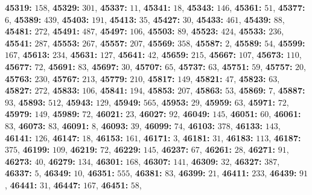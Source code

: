 \textsf{\bfseries 45319:} $158$, \textsf{\bfseries 45329:} $301$, \textsf{\bfseries 45337:} $11$, \textsf{\bfseries 45341:} $18$, \textsf{\bfseries 45343:} $146$, \textsf{\bfseries 45361:} $51$, \textsf{\bfseries 45377:} $6$, \textsf{\bfseries 45389:} $439$, \textsf{\bfseries 45403:} $191$, \textsf{\bfseries 45413:} $35$, \textsf{\bfseries 45427:} $30$, \textsf{\bfseries 45433:} $461$, \textsf{\bfseries 45439:} $88$, \textsf{\bfseries 45481:} $272$, \textsf{\bfseries 45491:} $487$, \textsf{\bfseries 45497:} $106$, \textsf{\bfseries 45503:} $89$, \textsf{\bfseries 45523:} $424$, \textsf{\bfseries 45533:} $236$, \textsf{\bfseries 45541:} $287$, \textsf{\bfseries 45553:} $267$, \textsf{\bfseries 45557:} $207$, \textsf{\bfseries 45569:} $358$, \textsf{\bfseries 45587:} $2$, \textsf{\bfseries 45589:} $54$, \textsf{\bfseries 45599:} $167$, \textsf{\bfseries 45613:} $234$, \textsf{\bfseries 45631:} $127$, \textsf{\bfseries 45641:} $42$, \textsf{\bfseries 45659:} $215$, \textsf{\bfseries 45667:} $107$, \textsf{\bfseries 45673:} $110$, \textsf{\bfseries 45677:} $72$, \textsf{\bfseries 45691:} $83$, \textsf{\bfseries 45697:} $30$, \textsf{\bfseries 45707:} $65$, \textsf{\bfseries 45737:} $63$, \textsf{\bfseries 45751:} $59$, \textsf{\bfseries 45757:} $20$, \textsf{\bfseries 45763:} $230$, \textsf{\bfseries 45767:} $213$, \textsf{\bfseries 45779:} $210$, \textsf{\bfseries 45817:} $149$, \textsf{\bfseries 45821:} $47$, \textsf{\bfseries 45823:} $63$, \textsf{\bfseries 45827:} $272$, \textsf{\bfseries 45833:} $106$, \textsf{\bfseries 45841:} $194$, \textsf{\bfseries 45853:} $207$, \textsf{\bfseries 45863:} $53$, \textsf{\bfseries 45869:} $7$, \textsf{\bfseries 45887:} $93$, \textsf{\bfseries 45893:} $512$, \textsf{\bfseries 45943:} $129$, \textsf{\bfseries 45949:} $565$, \textsf{\bfseries 45953:} $29$, \textsf{\bfseries 45959:} $63$, \textsf{\bfseries 45971:} $72$, \textsf{\bfseries 45979:} $149$, \textsf{\bfseries 45989:} $72$, \textsf{\bfseries 46021:} $23$, \textsf{\bfseries 46027:} $92$, \textsf{\bfseries 46049:} $145$, \textsf{\bfseries 46051:} $60$, \textsf{\bfseries 46061:} $83$, \textsf{\bfseries 46073:} $83$, \textsf{\bfseries 46091:} $8$, \textsf{\bfseries 46093:} $39$, \textsf{\bfseries 46099:} $74$, \textsf{\bfseries 46103:} $378$, \textsf{\bfseries 46133:} $143$, \textsf{\bfseries 46141:} $126$, \textsf{\bfseries 46147:} $18$, \textsf{\bfseries 46153:} $161$, \textsf{\bfseries 46171:} $3$, \textsf{\bfseries 46181:} $31$, \textsf{\bfseries 46183:} $113$, \textsf{\bfseries 46187:} $375$, \textsf{\bfseries 46199:} $109$, \textsf{\bfseries 46219:} $72$, \textsf{\bfseries 46229:} $145$, \textsf{\bfseries 46237:} $67$, \textsf{\bfseries 46261:} $28$, \textsf{\bfseries 46271:} $91$, \textsf{\bfseries 46273:} $40$, \textsf{\bfseries 46279:} $134$, \textsf{\bfseries 46301:} $168$, \textsf{\bfseries 46307:} $141$, \textsf{\bfseries 46309:} $32$, \textsf{\bfseries 46327:} $387$, \textsf{\bfseries 46337:} $5$, \textsf{\bfseries 46349:} $10$, \textsf{\bfseries 46351:} $555$, \textsf{\bfseries 46381:} $83$, \textsf{\bfseries 46399:} $21$, \textsf{\bfseries 46411:} $233$, \textsf{\bfseries 46439:} $91$, \textsf{\bfseries 46441:} $31$, \textsf{\bfseries 46447:} $167$, \textsf{\bfseries 46451:} $58$, 
